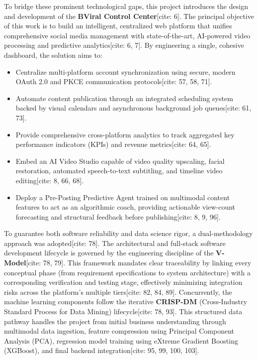 To bridge these prominent technological gaps, this project introduces the design and development of the \textbf{BViral Control Center}[cite: 6]. The principal objective of this work is to build an intelligent, centralized web platform that unifies comprehensive social media management with state-of-the-art, AI-powered video processing and predictive analytics[cite: 6, 7]. By engineering a single, cohesive dashboard, the solution aims to:
\begin{itemize}
    \item Centralize multi-platform account synchronization using secure, modern OAuth 2.0 and PKCE communication protocols[cite: 57, 58, 71].
    \item Automate content publication through an integrated scheduling system backed by visual calendars and asynchronous background job queues[cite: 61, 73].
    \item Provide comprehensive cross-platform analytics to track aggregated key performance indicators (KPIs) and revenue metrics[cite: 64, 65].
    \item Embed an AI Video Studio capable of video quality upscaling, facial restoration, automated speech-to-text subtitling, and timeline video editing[cite: 8, 66, 68].
    \item Deploy a Pre-Posting Predictive Agent trained on multimodal content features to act as an algorithmic coach, providing actionable view-count forecasting and structural feedback before publishing[cite: 8, 9, 96].
\end{itemize}

\noindent To guarantee both software reliability and data science rigor, a dual-methodology approach was adopted[cite: 78]. The architectural and full-stack software development lifecycle is governed by the engineering discipline of the \textbf{V-Model}[cite: 78, 79]. This framework mandates clear traceability by linking every conceptual phase (from requirement specifications to system architecture) with a corresponding verification and testing stage, effectively minimizing integration risks across the platform's multiple tiers[cite: 82, 84, 89]. Concurrently, the machine learning components follow the iterative \textbf{CRISP-DM} (Cross-Industry Standard Process for Data Mining) lifecycle[cite: 78, 93]. This structured data pathway handles the project from initial business understanding through multimodal data ingestion, feature compression using Principal Component Analysis (PCA), regression model training using eXtreme Gradient Boosting (XGBoost), and final backend integration[cite: 95, 99, 100, 103].

